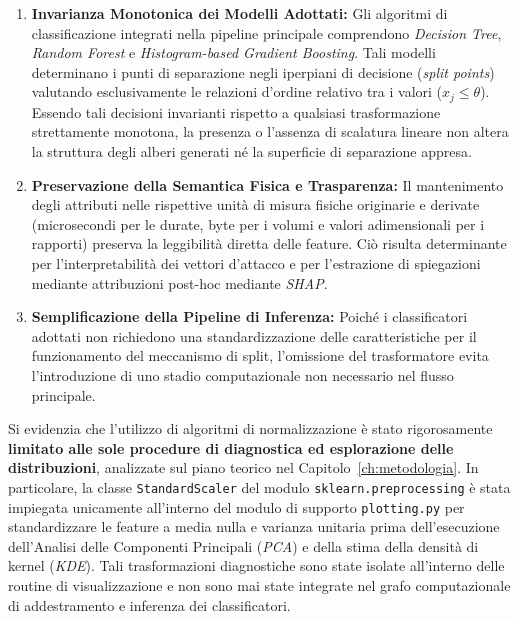 \begin{enumerate}
    \item \textbf{Invarianza Monotonica dei Modelli Adottati:}
    Gli algoritmi di classificazione integrati nella pipeline principale comprendono \textit{Decision Tree}, \textit{Random Forest} e \textit{Histogram-based Gradient Boosting}. 
    Tali modelli determinano i punti di separazione negli iperpiani di decisione (\textit{split points}) valutando esclusivamente le relazioni d'ordine relativo tra i valori ($x_j \le \theta$). 
    Essendo tali decisioni invarianti rispetto a qualsiasi trasformazione strettamente monotona, la presenza o l'assenza di scalatura lineare non altera la struttura degli alberi generati né la superficie di separazione appresa.

    \item \textbf{Preservazione della Semantica Fisica e Trasparenza:}
    Il mantenimento degli attributi nelle rispettive unità di misura fisiche originarie e derivate (microsecondi per le durate, byte per i volumi e valori adimensionali per i rapporti) preserva la leggibilità diretta delle feature. 
    Ciò risulta determinante per l'interpretabilità dei vettori d'attacco e per l'estrazione di spiegazioni mediante attribuzioni post-hoc mediante \textit{SHAP}.

    \item \textbf{Semplificazione della Pipeline di Inferenza:}
    Poiché i classificatori adottati non richiedono una standardizzazione delle caratteristiche per il funzionamento del meccanismo di split, l'omissione del trasformatore evita l'introduzione di uno stadio computazionale non necessario nel flusso principale.
\end{enumerate}

Si evidenzia che l'utilizzo di algoritmi di normalizzazione è stato rigorosamente \textbf{limitato alle sole procedure di diagnostica ed esplorazione delle distribuzioni}, analizzate sul piano teorico nel Capitolo~\ref{ch:metodologia}. 
In particolare, la classe \texttt{StandardScaler} del modulo \texttt{sklearn.preprocessing} è stata impiegata unicamente all'interno del modulo di supporto \texttt{plotting.py} per standardizzare le feature a media nulla e varianza unitaria prima dell'esecuzione dell'Analisi delle Componenti Principali (\textit{PCA}) e della stima della densità di kernel (\textit{KDE}). 
Tali trasformazioni diagnostiche sono state isolate all'interno delle routine di visualizzazione e non sono mai state integrate nel grafo computazionale di addestramento e inferenza dei classificatori.


